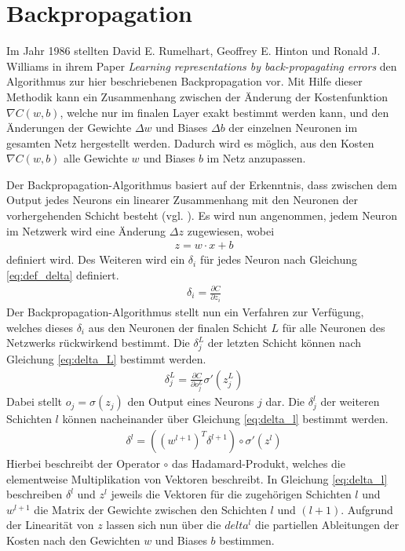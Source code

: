 \documentclass[../main.tex]{subfiles}
\begin{document}
\section{Backpropagation} \label{sec:backpropagation}
Im Jahr 1986 stellten David E. Rumelhart, Geoffrey E. Hinton und Ronald J. Williams in ihrem Paper \emph{Learning representations by back-propagating errors} den Algorithmus zur hier beschriebenen Backpropagation vor. Mit Hilfe dieser Methodik kann ein Zusammenhang zwischen der Änderung der Kostenfunktion $\nabla C(w,b)$, welche nur im finalen Layer exakt bestimmt werden kann, und den Änderungen der Gewichte $\Delta w$ und Biases $\Delta b$ der einzelnen Neuronen im gesamten Netz hergestellt werden. Dadurch wird es möglich, aus den Kosten $\nabla C(w,b)$ alle Gewichte $w$ und Biases $b$ im Netz anzupassen. \par 
Der Backpropagation-Algorithmus basiert auf der Erkenntnis, dass zwischen dem Output jedes Neurons ein linearer Zusammenhang mit den Neuronen der vorhergehenden Schicht besteht (vgl. \cite{BACKPROP_1986}). Es wird nun angenommen, jedem Neuron im Netzwerk wird eine Änderung $\Delta z$ zugewiesen, wobei \begin{align}\label{eq:def_z}z = w\cdot x + b\end{align} definiert wird. Des Weiteren wird ein $\delta_i$ für jedes Neuron nach Gleichung \ref{eq:def_delta} definiert.
\begin{align}
	\delta_i = \frac{\partial C}{\partial z_i} \label{eq:def_delta}
\end{align}
Der Backpropagation-Algorithmus stellt nun ein Verfahren zur Verfügung, welches dieses $\delta_i$ aus den Neuronen der finalen Schicht $L$ für alle Neuronen des Netzwerks rückwirkend bestimmt. Die $\delta_j^L$ der letzten Schicht können nach Gleichung \ref{eq:delta_L} bestimmt werden.
\begin{align}
	\delta_j^L = \frac{\partial C}{\partial o_j^L}\sigma'(z_j^L) \label{eq:delta_L}
\end{align}
Dabei stellt $o_j = \sigma(z_j)$ den Output eines Neurons $j$ dar. Die $\delta_j^l$ der weiteren Schichten $l$ können nacheinander über Gleichung \ref{eq:delta_l} bestimmt werden.
\begin{align}
	\delta^l = ((w^{l+1})^T\delta^{l+1}) \circ \sigma'(z^l) \label{eq:delta_l}
\end{align}
Hierbei beschreibt der Operator $\circ$ das Hadamard-Produkt, welches die elementweise Multiplikation von Vektoren beschreibt. In Gleichung \ref{eq:delta_l} beschreiben $\delta^l$ und $z^l$ jeweils die Vektoren für die zugehörigen Schichten $l$ und $w^{l+1}$ die Matrix der Gewichte zwischen den Schichten $l$ und $(l+1)$. Aufgrund der Linearität von $z$ lassen sich nun über die $delta^l$ die partiellen Ableitungen der Kosten nach den Gewichten $w$ und Biases $b$ bestimmen.
\end{document}
